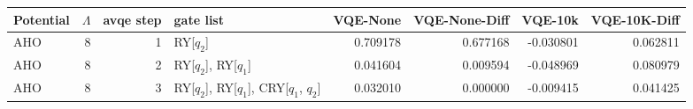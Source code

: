 \begin{tabular}{lrrlrrrr}
\toprule
Potential & $\Lambda$ & avqe step & gate list & VQE-None & VQE-None-Diff & VQE-10k & VQE-10K-Diff \\
\midrule
AHO & 8 & 1 & RY[$q_2$] & 0.709178 & 0.677168 & -0.030801 & 0.062811 \\
AHO & 8 & 2 & RY[$q_2$], RY[$q_1$] & 0.041604 & 0.009594 & -0.048969 & 0.080979 \\
AHO & 8 & 3 & RY[$q_2$], RY[$q_1$], CRY[$q_1$, $q_2$] & 0.032010 & 0.000000 & -0.009415 & 0.041425 \\
\bottomrule
\end{tabular}
